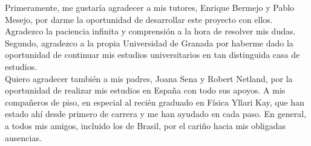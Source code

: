 \thispagestyle{empty}
       \vspace{1cm}


Primeramente, me gustaría agradecer a mis tutores, Enrique Bermejo y Pablo Mesejo,
por darme la oportunidad de desarrollar este proyecto con ellos. 
Agradezco la paciencia infinita y comprensión a la hora de resolver mis dudas. 
Segundo, agradezco a la propia Universidad de Granada por haberme dado la oportunidad 
de continuar mis estudios universitarios en tan distinguida casa de estudios. 
\\

Quiero agradecer también a mis padres, Joana Sena y Robert Netland, por la oportunidad 
de realizar mis estudios en España con todo sus apoyos. A mis compañeros de piso,
en especial al recién graduado en Física Yllari Kay, que han estado ahí desde 
primero de carrera y me han ayudado en cada paso. En general, a todos mis amigos, incluido los de Brasil,
por el cariño hacia mis obligadas ausencias. 
